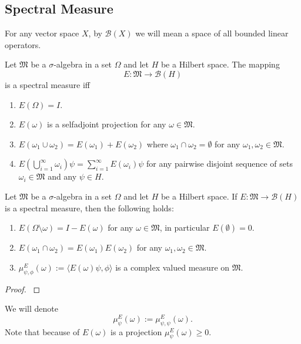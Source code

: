 \documentclass[main.tex]{subfiles}
\begin{document}
\subsection{Spectral Measure}
For any vector space $X$, by $\mathcal{B}(X)$ we will mean a space of all bounded linear operators.
\begin{definition}
Let $\mathfrak{M}$ be a $\sigma$-algebra in a set $\Omega$ and let $H$ be a Hilbert space. The mapping
\begin{equation}
E:\mathfrak{M}\to \mathcal{B}(H)
\end{equation}
is a spectral measure iff
\begin{enumerate}
\item $E(\Omega) = I$.
\item $E(\omega)$ is a selfadjoint projection for any $\omega\in\mathfrak{M}.$
\item $E(\omega_1\cup \omega_2) = E(\omega_1) + E(\omega_2)$ where $\omega_1\cap\omega_2=\emptyset$ for any $\omega_1, \omega_2\in\mathfrak{M}$.
\item $E(\bigcup_{i=1}^\infty\omega_i)\psi=\sum_{i=1}^\infty E(\omega_i)\psi$ for any pairwise disjoint sequence of sets $\omega_i\in\mathfrak{M}$ and any $\psi\in H$. 
\end{enumerate}
\end{definition}
\begin{theorem}
Let $\mathfrak{M}$ be a $\sigma$-algebra in a set $\Omega$ and let $H$ be a Hilbert space. If $E:\mathfrak{M}\to \mathcal{B}(H)$ is a spectral measure, then the following holds:
\begin{enumerate}
\item
$E(\Omega\setminus\omega) = I - E(\omega)$ for any $\omega\in\mathfrak{M}$, in particular $E(\emptyset)=0$.
\item
$E(\omega_1\cap\omega_2) = E(\omega_1)E(\omega_2)$ for any $\omega_1,\omega_2\in \mathfrak{M}$.
\item $\mu^E_{\psi, \phi}(\omega) := \langle E(\omega)\psi, \phi \rangle$ is a complex valued measure on $\mathfrak{M}$.
\end{enumerate}
\end{theorem}
\begin{proof}
\cite[see][The Spectral Theorem]{teschl2014}
\end{proof}
We will denote
\begin{equation}
\mu^E_\psi(\omega) := \mu^E_{\psi, \psi}(\omega).
\end{equation}
Note that because of $E(\omega)$ is a projection $\mu^E_\psi(\omega)\geq 0$.
\end{document}
